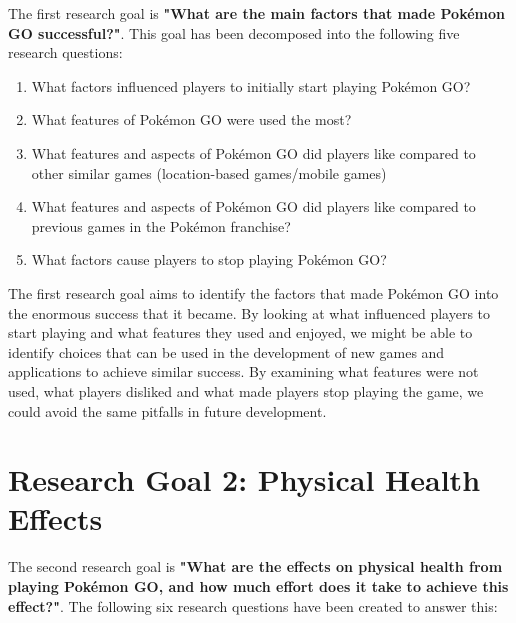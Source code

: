The first research goal is \textbf{"What are the main factors that made Pokémon GO successful?"}. This goal has been decomposed into the following five research questions:

\begin{enumerate}[label=RQ1.{\arabic*}]
	\item What factors influenced players to initially start playing Pokémon GO?\label{RQ1.1}
	\item What features of Pokémon GO were used the most?\label{RQ1.2}
	\item What features and aspects of Pokémon GO did players like compared to other similar games (location-based games/mobile games)\label{RQ1.3}
	\item What features and aspects of Pokémon GO did players like compared to previous games in the Pokémon franchise?\label{RQ1.4}
	\item What factors cause players to stop playing Pokémon GO?\label{RQ1.5}
\end{enumerate}

The first research goal aims to identify the factors that made Pokémon GO into the enormous success that it became. By looking at what influenced players to start playing and what features they used and enjoyed, we might be able to identify choices that can be used in the development of new games and applications to achieve similar success. By examining what features were not used, what players disliked and what made players stop playing the game, we could avoid the same pitfalls in future development.

\section{Research Goal 2: Physical Health Effects}
\label{rg2}

The second research goal is \textbf{"What are the effects on physical health from playing Pokémon GO, and how much effort does it take to achieve this effect?"}. The following six research questions have been created to answer this:

